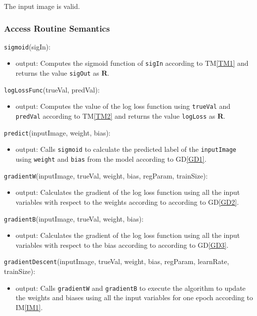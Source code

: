 \documentclass[12pt, titlepage]{article}
\def\code#1{\texttt{#1}}
\begin{document}
The input image is valid.

\subsubsection{Access Routine Semantics}

\noindent \code{sigmoid}(sigIn):
\begin{itemize}
\item output: Computes the sigmoid function of \code{sigIn} according to TM\ref{TM1}
and returns the value \code{sigOut} as $\mathbf{R}$.
\end{itemize}

\noindent \code{logLossFunc}(trueVal, predVal):
\begin{itemize}
\item output: Computes the value of the log loss function using \code{trueVal} and \code{predVal}
according to TM\ref{TM2} and returns the value \code{logLoss} as $\mathbf{R}$.
\end{itemize}

\noindent \code{predict}(inputImage, weight, bias):
\begin{itemize}
\item output: Calls \code{sigmoid} to calculate the predicted label of the \code{inputImage}
using \code{weight} and \code{bias} from the model according to GD\ref{GD1}.
\end{itemize}

\noindent \code{gradientW}(inputImage, trueVal, weight, bias, regParam, trainSize):
\begin{itemize}
\item output: Calculates the gradient of the log loss function using all the input variables
with respect to the weights according to according to GD\ref{GD2}.
\end{itemize}

\noindent \code{gradientB}(inputImage, trueVal, weight, bias):
\begin{itemize}
  \item output: Calculates the gradient of the log loss function using all the input variables
  with respect to the bias according to according to GD\ref{GD3}.
\end{itemize}

\noindent \code{gradientDescent}(inputImage, trueVal, weight, bias, regParam, learnRate, trainSize):
\begin{itemize}
\item output: Calls \code{gradientW} and \code{gradientB} to
execute the algorithm to update the weights and biases using all the input variables 
for one epoch according to IM\ref{IM1}.
\end{itemize}
\end{document}
